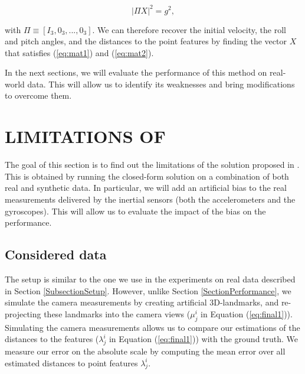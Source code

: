 \documentclass[letterpaper, 10 pt, journal, final]{ieeeconf}  %
\begin{document}
\begin{equation}
\label{eq:mat2}
| \Pi X | ^2 = g^2,
\end{equation}

\noindent with $\Pi \equiv [I_3, 0_3, ..., 0_3]$. We can therefore recover the initial velocity, the roll and pitch angles, and the distances to the point features
by finding the vector $X$ that satisfies (\ref{eq:mat1}) and (\ref{eq:mat2}).

In the next sections, we will evaluate the performance of this method on real-world data.
This will allow us to identify its weaknesses and bring modifications to overcome them.





\section{LIMITATIONS OF \cite{Martinelli2014}}\label{SectionBottlenecks}

The goal of this section is to find out the limitations of the solution proposed in \cite{Martinelli2014}.
This is obtained by running the closed-form solution on a combination of both real and synthetic data.
In particular, we will add an artificial bias to the real measurements delivered by the inertial sensors (both the accelerometers and the gyroscopes).
This will allow us to evaluate the impact of the bias on the performance.

\subsection{Considered data}\label{SubsectionConsidered}

The setup is similar to the one we use in the experiments on real data described in Section \ref{SubsectionSetup}.
However, unlike Section \ref{SectionPerformance}, we simulate the camera measurements by creating artificial 3D-landmarks, and re-projecting these landmarks into the camera views ($\mu_j^i$ in Equation (\ref{eq:final1})).
Simulating the camera measurements allows us to compare our estimations of the distances to the features ($\lambda_j^i$ in Equation (\ref{eq:final1})) with the ground truth.
We measure our error on the absolute scale by computing the mean error over all estimated distances to point features $\lambda_j^i$.
\end{document}
